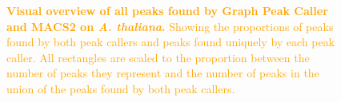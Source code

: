 \documentclass[10pt,letterpaper]{article}
\newcommand{\revision}[1]{\textcolor{orange}{#1}}
\begin{document}
\begin{figure}[!h]
 \caption{\revision{{\bf Visual overview of all peaks found by Graph Peak Caller and MACS2 on \emph{A. thaliana}.} Showing the proportions of peaks found by both peak callers and peaks found uniquely by each peak caller. All rectangles are scaled to the proportion between the number of peaks they represent and the number of peaks in the union of the peaks found by both peak callers.}}
\label{asdf}
\end{figure}
\end{document}
